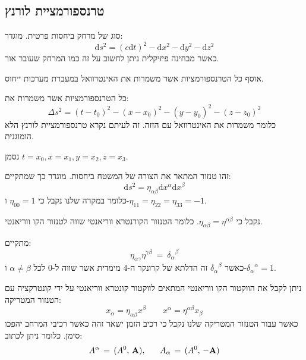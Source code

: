 \documentclass{tstextbook}
\begin{document}
\subsection{טרנספורמציית לורנץ}

\begin{definition}[אינטרוואל]
סוג של מרחק ביחסות פרטית. מוגדר:
$$ \mathrm{d}s^{2} = \left( c\mathrm{d}t \right)^2-\mathrm{d}x^2-\mathrm{d}y^2-\mathrm{d}z^2$$
כאשר מבחינה פיזיקלית ניתן לחשוב על זה כמו המרחק שעובר אור.

\end{definition}
\begin{definition}
אוסף כל הטרנספורמציות אשר משמרות את האינטרוואל במעברת מערכות ייחוס.

\end{definition}
\begin{definition}
כל הטרנספורמציות אשר משמרות את:
$$\Delta s^{2}=(t-t_{0})^{2}-(x-x_{0})^{2}-(y-y_{0})^{2}-(z-z_{0})^{2}$$
כלומר משמרות את האינטרוואל עם הזזה. זה לעיתם נקרא טרנספורמציית לורנץ הלא הומוגנית.

\end{definition}
\begin{symbolize}
נסמן \(t=x_{0},x=x_{1},y=x_{2},z=x_{3}\).

\end{symbolize}
\begin{definition}
זהו טנזור המתאר את הצורה של המשטח ביחסות. מוגדר כך שמתקיים:
$$\mathrm{d}s ^{2}=\eta_{\alpha \beta}\mathrm{d}x^{\alpha}\mathrm{d}x^{\beta}$$
כלומר במקרה שלנו נקבל כי \(\eta_{00}=1\) ו-\(\eta_{11}=\eta_{22}=\eta_{33}=-1\).

\end{definition}
\begin{remark}
נקבל כי \(\eta_{\alpha \beta}=\eta^{\alpha \beta}\). כלומר הטנזור הקורנטרא ווריאנטי שווה לטנזור הקו ווריאנטי.

\end{remark}
\begin{proposition}
מתקיים:$$
\eta_{\alpha\gamma}\eta^{\gamma\beta}\:=\:{\delta_{\alpha}}^{\beta}$$
כאשר \({\delta_{\alpha}}^{\beta}\) זה הדלתא של קרונקר ה-4 מימדית אשר שווה ל-0 לכל \(\alpha \neq \beta\) ו-\({\delta_{\alpha}}^{\alpha}=1\).

\end{proposition}
\begin{proposition}
ניתן לקבל את הווקטור הקו ווריאנטי המתאים לווקטור קונטרא ווריאנטי על ידי קונטרקציה עם הטנזור המטריקה:
$$x_{\alpha}=\eta_{\alpha \beta}x^{\beta}\qquad x^{\alpha}=\eta^{\alpha \beta}x_{\beta}$$
כאשר עבור הטנזור המטריקה שלנו נקבל כי רכיב הזמן ישאר זהה כאשר רכיבי המרחב יהפכו סימן. כלומר ניתן לכתוב:
$$A^{\alpha}\,=\,(A^{0},\,{\bf A}),\;\;\;\;\;\;A_{\alpha}\,=\,(A^{0},\,-{\bf A})$$

\end{proposition}
\end{document}
